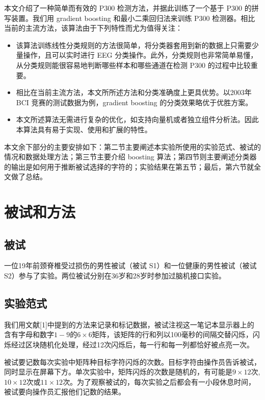 \documentclass[a4paper]{ecust_thesis_translation}
\renewcommand\![1]{\immature{#1}}
\begin{document}
本文介绍了一种简单而有效的 P300 检测方法，并据此训练了一个基于 P300 的拼写装置。我们用 gradient boosting 和最小二乘回归法来训练 P300 检测器。相比当前的主流方法，该算法由于下列特性而尤为值得关注：

\begin{itemize}
  \item 该算法训练线性分类规则的方法很简单，将分类器套用到新的数据上只需要少量操作，且可以实时进行 EEG 分类操作。此外，分类规则也非常简单易懂，从分类规则能很容易地判断哪些样本和哪些通道在检测 P300 的过程中比较重要。
  \item 相比在当前主流方法，本文所所述方法和分类准确度上更具优势。以2003年 BCI 竞赛的测试数据为例，gradient boosting 的分类效果略优于优胜方案。
  \item 本文所述算法无需进行复杂的优化，如支持向量机或者独立组件分析法。因此本算法具有易于实现、使用和扩展的特性。
\end{itemize}

本文余下部分的主要安排如下：第二节主要阐述本实验所使用的实验范式、被试的情况和数据处理方法；第三节主要介绍 boosting 算法；第四节则主要阐述分类器的输出是如何用于推断被试选择的字符的；实验结果在第五节；最后，第六节就全文做了总结。

\section{被试和方法}
\subsection{被试}
一位19年前颈脊椎受过损伤的男性被试（被试 S1）和一位健康的男性被试（被试 S2）参与了实验。两位被试分别在36岁和28岁时参加过脑机接口实验。

\subsection{实验范式}
我们用文献[1]中提到的方法来记录和标记数据，被试注视这一笔记本显示器上的含有字母和数字$1-9$的$6\times 6$矩阵，该矩阵的行和列以100毫秒的间隔交替闪烁，闪烁经过区块随机化处理，经过12次闪烁后，每一行和每一列都恰好被点亮一次。

被试要记数每次实验中矩阵种目标字符闪烁的次数。目标字符由操作员告诉被试，同时显示在屏幕下方。单次实验中，矩阵闪烁的次数是随机的，有可能是$9\times 12$次, $10\times 12$次或$11\times 12$次。为了观察被试的，每次实验之后都会有一小段休息时间，被试要向操作员汇报他们记数的结果。
\end{document}
